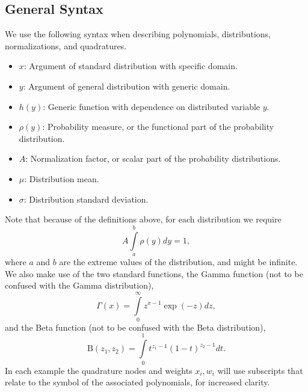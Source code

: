 \subsection{General Syntax}
We use the following syntax when describing polynomials, distributions, normalizations, and quadratures.
\begin{itemize}
  \item $x$: Argument of standard distribution with specific domain.
  \item $y$: Argument of general distribution with generic domain.
  \item $h(y)$: Generic function with dependence on distributed variable $y$.
\item $\rho(y)$: Probability measure, or the functional part of the probability distribution.
\item $A$: Normalization factor, or scalar part of the probability distributions.
\item $\mu$: Distribution mean.
\item $\sigma$: Distribution standard deviation.
\end{itemize}
Note that because of the definitions above, for each distribution we require
\begin{equation}
  A \int\limits_a^b \rho(y) dy = 1,
\end{equation}
where $a$ and $b$ are the extreme values of the distribution, and might be infinite.
We also make use of the two standard functions, the Gamma function (not to be confused with the Gamma
distribution),
\begin{equation}
  \Gamma(x) = \int\limits_0^\infty z^{x-1}\exp(-z) dz,
\end{equation}
and the Beta function (not to be confused with the Beta distribution),
\begin{equation}
  \text{B}(z_1,z_2) = \int\limits_0^1 t^{z_1-1}(1-t)^{z_2-1} dt.
\end{equation}
In each example the quadrature nodes and weights $x_i,w_i$ will use subscripts that relate to the symbol of the
associated polynomials, for increased clarity.

